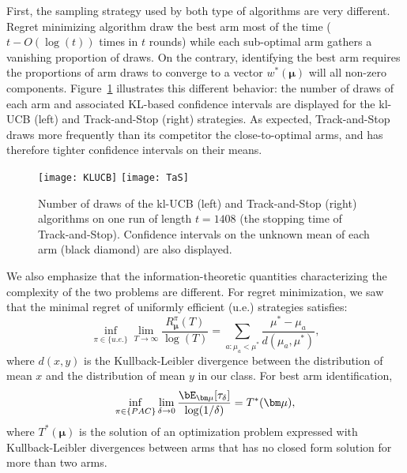 \documentclass[proc]{edpsmath}
\begin{document}
	First, the sampling strategy used by both type of algorithms are very different. Regret minimizing algorithm draw the best arm most of the time ($t - O(\log(t))$ times in $t$ rounds) while each sub-optimal arm gathers a vanishing proportion of draws. On the contrary, identifying the best arm requires the proportions of arm draws to converge to a vector $w^*(\bm \mu)$ will all non-zero components. Figure~\ref{fig:DifferenceBAIRM} illustrates this different behavior: the number of draws of each arm and associated KL-based confidence intervals are displayed for the kl-UCB (left) and Track-and-Stop (right) strategies. As expected, Track-and-Stop  draws more frequently than its competitor the close-to-optimal arms, and has therefore tighter confidence intervals on their means. 
	
	\begin{figure}[h]
		\texttt{[image: KLUCB]}
		\texttt{[image: TaS]}
		\caption{\label{fig:DifferenceBAIRM} Number of draws of the kl-UCB (left) and Track-and-Stop (right) algorithms on one run of length $t=1408$ (the stopping time of Track-and-Stop). Confidence intervals on the unknown mean of each arm (black diamond) are also displayed.}
	\end{figure}
	
	We also emphasize that the information-theoretic quantities characterizing the complexity of the two problems are different. For regret minimization, we saw that the minimal regret of uniformly efficient (u.e.) strategies satisfies:
	\[\inf_{\pi \in \{u.e.\}} \lim_{T\rightarrow \infty} \frac{R_{\bm \mu}^\pi(T)}{\log(T)} = \sum_{a : \mu_a < \mu^*}\frac{\mu^* - \mu_a}{d(\mu_a,\mu^*)},\]
	where $d(x,y)$ is the Kullback-Leibler divergence between the distribution of mean $x$ and the distribution of mean $y$ in our class. For best arm identification,
	\[\inf_{\pi \in \{PAC\}} \lim_{\delta\rightarrow 0} \frac{\bE_{\bm\mu}[\tau_\delta]}{\log(1/\delta)} = T^*(\bm \mu),\]
	where $T^*(\bm \mu)$ is the solution of an optimization problem expressed with Kullback-Leibler divergences between arms that has no closed form solution for more than two arms.
	
\end{document}
